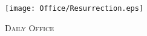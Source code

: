 \fancyhead[RE,LO]{}\fancyhead[RO,LE]{}
\fancyhead[C]{}\thispagestyle{empty}
\mainmatter
{}
{}

\begin{figure}[H]
    \centering
    \texttt{[image: Office/Resurrection.eps]}
    \caption{\textsc{\Huge{Daily Office}}}
\end{figure}